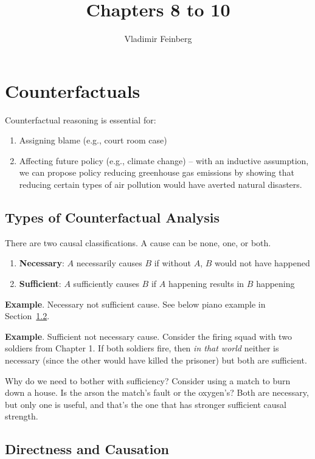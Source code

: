 \documentclass{article}
\title{Chapters 8 to 10}
\author{Vladimir Feinberg}
\begin{document}
\maketitle

\setcounter{section}{7}
\section{Counterfactuals}

Counterfactual reasoning is essential for:

\begin{enumerate}
\item Assigning blame (e.g., court room case)
\item Affecting future policy (e.g., climate change) -- with an inductive assumption, we can propose policy reducing greenhouse gas emissions by showing that reducing certain types of air pollution would have averted natural disasters.
\end{enumerate}

\subsection{Types of Counterfactual Analysis}

There are two causal classifications. A cause can be none, one, or both.

\begin{enumerate}
\item \textbf{Necessary}: $A$ necessarily causes $B$ if without $A$, $B$ would not have happened
\item \textbf{Sufficient}: $A$ sufficiently causes $B$ if $A$ happening results in $B$ happening
\end{enumerate}

\textbf{Example}. Necessary not sufficient cause. See below piano example in Section~\ref{sec:directness-causation}.

\textbf{Example}. Sufficient not necessary cause. Consider the firing squad with two soldiers from Chapter 1. If both soldiers fire, then \textit{in that world} neither is necessary (since the other would have killed the prisoner) but both are sufficient.

Why do we need to bother with sufficiency? Consider using a match to burn down a house. Is the arson the match's fault or the oxygen's? Both are necessary, but only one is useful, and that's the one that has stronger sufficient causal strength.

\subsection{Directness and Causation}\label{sec:directness-causation}
\end{document}
